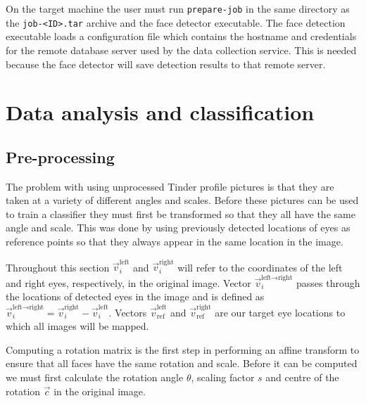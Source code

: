 On the target machine the user must run \texttt{prepare-job} in the same
directory as the \texttt{job-<ID>.tar} archive and the face detector
executable. The face detection executable loads a configuration file which
contains the hostname and credentials for the remote database server used by
the data collection service. This is needed because the face detector will save
detection results to that remote server.

\section{Data analysis and classification}



\subsection{Pre-processing}
\label{spec:preproc}
\newcommand{\vleftright}{\vec{v}_i^{\text{left} \rightarrow \text{right}}}
\newcommand{\vi}[1]{\vec{v}_i^{\text{#1}}}
\newcommand{\vr}[1]{\vec{v}_{\text{ref}}^{\text{#1}}}
\newcommand{\vref}{\vec{v}_{\text{ref}}^{\text{left} \rightarrow \text{right}}}
The problem with using unprocessed Tinder profile pictures is that they are 
taken at a variety of different angles and scales. Before these pictures can 
be used to train a classifier they must first be transformed so that they all 
have the same angle and scale. This was done by using previously detected 
locations of eyes as reference points so that they always appear in the same 
location in the image. 

Throughout this section $\vi{left}$ and $\vi{right}$ will refer to the
coordinates of the left and right eyes, respectively, in the original image.
Vector $\vleftright$ passes through the locations of detected eyes in the image
and is defined as $\vleftright = \vi{right} - \vi{left}$. Vectors
$\vr{left}$ and $\vr{right}$ are our target eye locations to which all images
will be mapped.

Computing a rotation matrix is the first step in performing an affine transform
to ensure that all faces have the same rotation and scale. Before it can be 
computed we must first calculate the rotation angle $\theta$, scaling factor
$s$ and centre of the rotation $\vec{c}$ in the original image.

